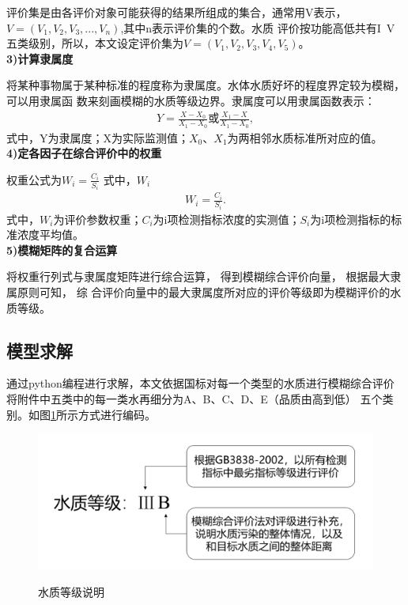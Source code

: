 \documentclass{whutmod}
\begin{document}
\begin{spacing}{1.2}
评价集是由各评价对象可能获得的结果所组成的集合，通常用V表示，$V=(V_1,V_2,V_3,...,V_n)$,其中n表示评价集的个数。水质
评价按功能高低共有I~V五类级别，所以，本文设定评价集为$V=(V_1,V_2,V_3,V_4,V_5)$。
~\\
\textbf{3)计算隶属度}

将某种事物属于某种标准的程度称为隶属度。水体水质好坏的程度界定较为模糊， 可以用隶属函
数来刻画模糊的水质等级边界。隶属度可以用隶属函数表示：
\begin{equation}
	\label{2}
	\begin{split}
    Y=\frac{X-X_0}{X_1-X_0} \mbox{或} \frac{X_1-X}{X_1-X_0},
	\end{split}
\end{equation}
式中，Y为隶属度；X为实际监测值；$X_0$、$X_1$为两相邻水质标准所对应的值。
~\\
\textbf{4)定各因子在综合评价中的权重}

权重公式为$W_i=\frac{C_i}{S_i}$
式中，$W_i$
\begin{equation}
	\label{2}
	\begin{split}
     W_i=\frac{C_i}{S_i}.
	\end{split}
\end{equation}
式中，$W_i$为评价参数权重；$C_i$为i项检测指标浓度的实测值；$S_i$为i项检测指标的标准浓度平均值。
~\\
\textbf{5)模糊矩阵的复合运算}

   将权重行列式与隶属度矩阵进行综合运算， 得到模糊综合评价向量， 根据最大隶属原则可知， 综
合评价向量中的最大隶属度所对应的评价等级即为模糊评价的水质等级。

\subsection{模型求解}
通过python编程进行求解，本文依据国标对每一个类型的水质进行模糊综合评价
将附件中五类中的每一类水再细分为A、B、C、D、E（品质由高到低）
五个类别。如图\ref{水质等级说明}所示方式进行编码。

\begin{figure}[H]
	\centering
	\includegraphics[width=.8\textwidth]{水质等级说明.png}
	\label{水质等级说明}
	\caption{水质等级说明}
\end{figure}



\end{spacing}
\end{document}
